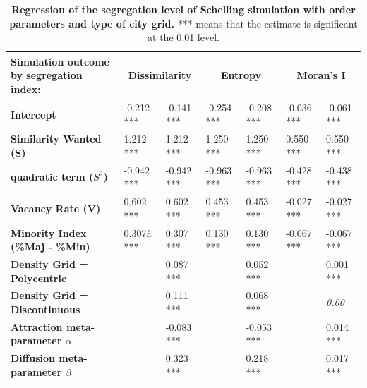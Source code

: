 \documentclass[Royal,sageh,times]{sagej}
\begin{document}
\begin{table}[]
\centering
\caption{\textbf{Regression of the segregation level of Schelling simulation with order parameters and type of city grid.} *** means that the estimate is significant at the 0.01 level.}
\label{tab:regressionSchelling}
\begin{adjustwidth}{-1cm}{-1cm}
\begin{tabular}{|m{2.5cm}|ll|ll|ll|}
\hline
Simulation outcome by segregation index:    & \multicolumn{2}{c|}{\textbf{Dissimilarity}}   & \multicolumn{2}{c|}{\textbf{Entropy}} & \multicolumn{2}{c|}{\textbf{Moran's I}} \\ \hline
\textbf{Intercept}                          & -0.212 *** & -0.141 ***                       & -0.254 ***        & -0.208 ***        & -0.036 ***           & -0.061 ***               \\ \hline
\textbf{Similarity Wanted (S)}              & 1.212 ***  & 1.212 ***                        & 1.250 ***         & 1.250 ***         & 0.550 ***            & 0.550 ***                \\ 
\textbf{quadratic term ($S^2$)}               & -0.942 *** & -0.942 ***                       & -0.963 ***        & -0.963 ***        & -0.428 ***           & -0.438 ***               \\ 
\textbf{Vacancy Rate (V)}                   & 0.602 ***  & 0.602 ***                        & 0.453 ***         & 0.453 ***         & -0.027 ***           & -0.027 ***               \\ 
\textbf{Minority Index (\%Maj - \%Min)}     & 0.307å ***  & 0.307 ***                        & 0.130 ***         & 0.130 ***         & -0.067 ***           & -0.067 ***               \\ \hline
\textbf{Density Grid = Polycentric}         &            & 0.087 ***                        &                   & 0.052 ***         &                      & 0.001 ***                \\ 
\textbf{Density Grid = Discontinuous}       &            & 0.111 ***                        &                   & 0.068 ***         &                      & \textit{0.00}              \\
\textbf{Attraction meta-parameter $\alpha$} &            & -0.083 ***                       &                   & -0.053 ***        &                      & 0.014 ***                \\ 
\textbf{Diffusion meta-parameter $\beta$}   &            & 0.323 ***                        &                   & 0.218 ***         &                      & 0.017 ***           \\ \hline

\end{tabular}
\end{adjustwidth}
\end{table}
\end{document}

